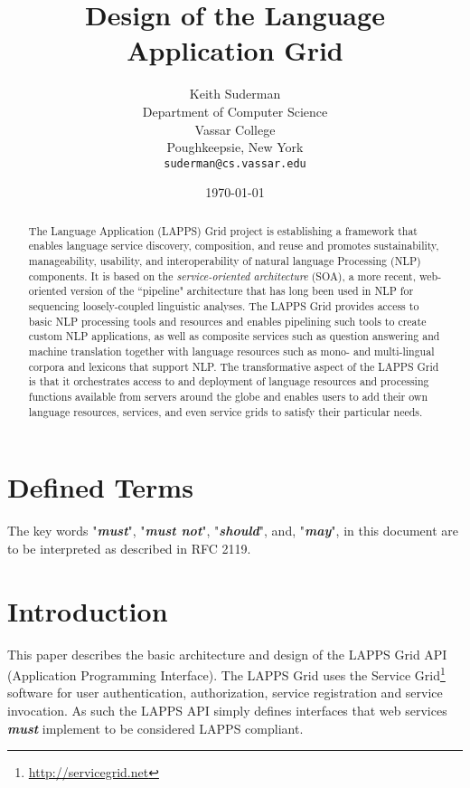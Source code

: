 \documentclass{article}
\newcommand{\lapps}{LAPPS\xspace}
\newcommand{\definedterm}[1]{\textbf{\textit{#1}}\xspace}
\newcommand{\must}{\definedterm{must}}
\newcommand{\mustnot}{\definedterm{must not}}
\newcommand{\should}{\definedterm{should}}
\newcommand{\may}{\definedterm{may}}
\begin{document}
\title{Design of the Language Application Grid}
\author{Keith Suderman\\
Department of Computer Science\\
Vassar College\\
Poughkeepsie, New York\\
\texttt{suderman@cs.vassar.edu}}
\date{\today}
\maketitle

\begin{abstract}
The Language Application (LAPPS) Grid project
is establishing a
framework that enables language service discovery, composition, and reuse and promotes sustainability, manageability, usability, and interoperability of natural language Processing (NLP) components. It is based on the {\it service-oriented architecture} (SOA), a more recent, web-oriented version of the  ``pipeline" architecture that has long been used in NLP for sequencing loosely-coupled linguistic analyses. 
The LAPPS Grid provides access to basic NLP processing tools and resources and enables pipelining such tools to create custom NLP applications, as well as
composite services such as question answering and machine translation together with language resources such as mono- and multi-lingual corpora and lexicons that support NLP. 
The transformative aspect of the LAPPS Grid is that it orchestrates  access to and deployment of language resources and processing functions available from servers around the globe and enables users to add their own language resources, services, and even service grids to satisfy their particular needs.
\end{abstract}

\section{Defined Terms}
The key words "\must", "\mustnot", "\should", and,  "\may", in this document are to be interpreted as described in
      RFC 2119\cite{rfc2119}.

\section{Introduction}

This paper describes the basic architecture and design of the \lapps Grid API (Application Programming Interface). The \lapps Grid uses the Service Grid\footnote{\url{http://servicegrid.net}} software for user authentication, authorization, service registration and service invocation. As such the \lapps API simply defines interfaces that web services \must implement to be considered \lapps compliant.
\end{document}
